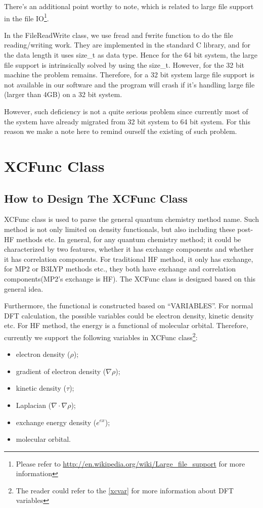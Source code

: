 There's an additional point worthy to note, which is related to large 
file support in the file IO\footnote{Please refer to 
\url{http://en.wikipedia.org/wiki/Large_file_support} for more information}.

In the FileReadWrite class, we use fread and fwrite function to do the file
reading/writing work. They are implemented in the standard C library, and 
for the data length it uses size\_t as data type. Hence for the 64 bit system,
the large file support is intrinsically solved by using the size\_t. However,
for the 32 bit machine the problem remains. Therefore, for a 32 bit system
large file support is not available in our software and the program will 
crash if it's handling large file (larger than 4GB) on a 32 bit system.

However, such deficiency is not a quite serious problem since currently most 
of the system have already migrated from 32 bit system to 64 bit system. For
this reason we make a note here to remind ourself the existing of such problem.

\section{XCFunc Class}

\subsection{How to Design The XCFunc Class}
%
%

XCFunc class is used to parse the general quantum chemistry method name.
Such method is not only limited on density functionals, but also including 
these post-HF methods etc. In general, for any quantum chemistry method;
it could be characterized by two features, whether it has exchange 
components and whether it has correlation components. For traditional 
HF method, it only has exchange, for MP2 or B3LYP methods etc., they 
both have exchange and correlation components(MP2's exchange is HF). 
The XCFunc class is designed based on this general idea.

Furthermore, the functional is constructed based on ``VARIABLES''. For 
normal DFT calculation, the possible variables could be electron density,
kinetic density etc. For HF method, the energy is a functional of molecular
orbital. Therefore, currently we support the following variables in XCFunc
class\footnote{The reader could refer to the \ref{xcvar} for more information
about DFT variables}:
\begin{itemize}
 \item  electron density ($\rho$);
 \item  gradient of electron density ($\nabla\rho$);
 \item  kinetic density ($\tau$);
 \item  Laplacian ($\nabla\cdotp\nabla\rho$);
 \item  exchange energy density ($e^{ex}$);
 \item  molecular orbital.
\end{itemize}

